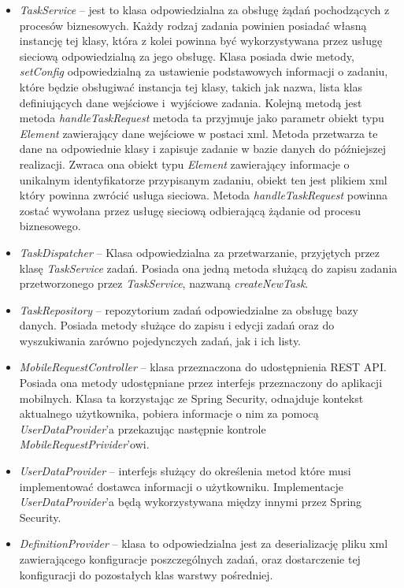\begin{itemize}
\item \textit{TaskService} -- jest to klasa odpowiedzialna za obsługę żądań pochodzących z procesów biznesowych. Każdy rodzaj zadania powinien posiadać własną instancję tej klasy, która z kolei powinna być wykorzystywana przez usługę sieciową odpowiedzialną za jego obsługę. Klasa posiada dwie metody, \textit{setConfig} odpowiedzialną za ustawienie podstawowych informacji o zadaniu, które będzie obsługiwać instancja tej klasy, takich jak nazwa, lista klas definiujących dane wejściowe i~wyjściowe zadania. Kolejną metodą jest metoda \textit{handleTaskRequest} metoda ta przyjmuje jako parametr obiekt typu \textit{Element} zawierający dane wejściowe w postaci xml. Metoda przetwarza te dane na odpowiednie klasy i zapisuje zadanie w bazie danych do późniejszej realizacji. Zwraca ona obiekt typu \textit{Element} zawierający informacje o unikalnym identyfikatorze przypisanym zadaniu, obiekt ten jest plikiem xml który powinna zwrócić usługa sieciowa. Metoda \textit{handleTaskRequest} powinna zostać wywołana przez usługę sieciową odbierającą żądanie od procesu biznesowego.
\item \textit{TaskDispatcher} -- Klasa odpowiedzialna za przetwarzanie, przyjętych przez klasę \textit{TaskService} zadań. Posiada ona jedną metoda służącą do zapisu zadania przetworzonego przez \textit{TaskService}, nazwaną \textit{createNewTask}.
\item \textit{TaskRepository} -- repozytorium zadań odpowiedzialne za obsługę bazy danych. Posiada metody służące do zapisu i edycji zadań oraz do wyszukiwania zarówno pojedynczych zadań, jak i ich listy. 
\item \textit{MobileRequestController} -- klasa przeznaczona do udostępnienia REST API. Posiada ona metody udostępniane przez interfejs przeznaczony do aplikacji mobilnych. Klasa ta korzystając ze Spring Security, odnajduje kontekst aktualnego użytkownika, pobiera informacje o nim za pomocą \textit{UserDataProvider}'a przekazując następnie kontrole \textit{MobileRequestPrivider}'owi. 
\item \textit{UserDataProvider} -- interfejs służący do określenia metod które musi implementować dostawca informacji o użytkowniku. Implementacje \textit{UserDataProvider}'a będą wykorzystywana między innymi przez Spring Security.
\item \textit{DefinitionProvider} -- klasa to odpowiedzialna jest za deserializację pliku xml zawierającego konfiguracje poszczególnych zadań, oraz dostarczenie tej konfiguracji do pozostałych klas warstwy pośredniej. 

\end{itemize}
